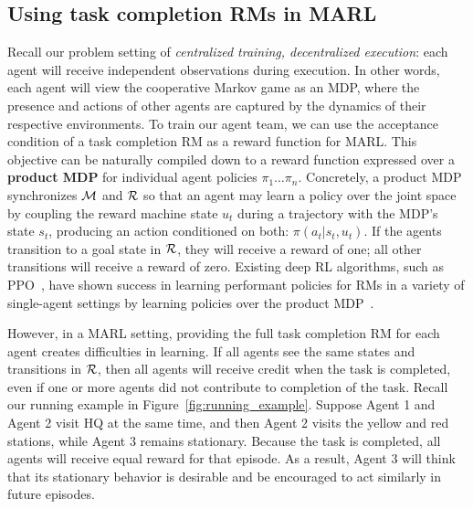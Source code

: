 \subsection{Using task completion RMs in MARL}

Recall our problem setting of \textit{centralized training, decentralized execution}: each agent will receive independent observations during execution. In other words, each agent will view the cooperative Markov game as an MDP, where the presence and actions of other agents are captured by the dynamics of their respective environments. 
To train our agent team, we can use the acceptance condition of a task completion RM as a reward function for MARL. This objective can be naturally compiled down to a reward function expressed over a \textbf{product MDP} for individual agent policies $\pi_1 \dots \pi_n$. Concretely, a product MDP synchronizes $\mathcal{M}$ and $\mathcal{R}$ so that an agent may learn a policy over the joint space by coupling the reward machine state $u_t$ during a trajectory with the MDP's state $s_t$, producing an action conditioned on both: $\pi(a_t | s_t, u_t)$. If the agents transition to a goal state in $\mathcal{R}$, they will receive a reward of one; all other transitions will receive a reward of zero. Existing deep RL algorithms, such as PPO~\cite{schulman2017ppo}, have shown success in learning performant policies for RMs in a variety of single-agent settings by learning policies over the product MDP~\cite{Li2024noisyuncertain, voloshin2023eventual}.  


However, in a MARL setting, providing the full task completion RM for each agent creates difficulties in learning. If all agents see the same states and transitions in $\mathcal{R}$, then all agents will receive credit when the task is completed, even if one or more agents did not contribute to completion of the task. Recall our running example in Figure~\ref{fig:running_example}. Suppose Agent 1 and Agent 2 visit HQ at the same time, and then Agent 2 visits the yellow and red stations, while Agent 3 remains stationary. Because the task is completed, all agents will receive equal reward for that episode. As a result, Agent 3 will think that its stationary behavior is desirable and be encouraged to act similarly in future episodes. 

